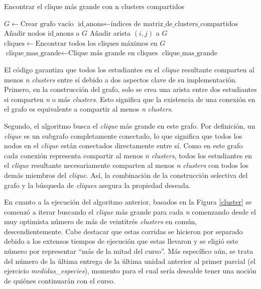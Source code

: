 \documentclass[11pt,a4paper,twoside,openany]{tesis}
\begin{document}
\begin{algorithm}[H]
\caption{Encontrar el clique más grande con n clusters compartidos}
\begin{algorithmic}[1]
    \State $G \gets \text{Crear grafo vacío}$
    \State $\text{id\_anons} \gets \text{índices de matriz\_de\_clusters\_compartidos}$
    \State Añadir nodos $\text{id\_anons}$ a $G$
            \State Añadir arista $(i, j)$ a $G$
        \EndIf
    \EndFor
    \State $\text{cliques} \gets \text{Encontrar todos los cliques máximos en } G$
    \State $\text{clique\_mas\_grande} \gets \text{Clique más grande en cliques}$
    \State \Return $\text{clique\_mas\_grande}$
\EndFunction
\end{algorithmic}
\end{algorithm}

El código garantiza que todos los estudiantes en el \emph{clique} resultante comparten al menos \emph{n} \emph{clusters} entre sí debido a dos aspectos clave de su implementación. Primero, en la construcción del grafo, solo se crea una arista entre dos estudiantes si comparten \emph{n} o más \emph{clusters}. Esto significa que la existencia de una conexión en el grafo es equivalente a compartir al menos \emph{n} \emph{clusters}.

Segundo, el algoritmo busca el \emph{clique} más grande en este grafo. Por definición, un \emph{clique} es un subgrafo completamente conectado, lo que significa que todos los nodos en el \emph{clique} están conectados directamente entre sí. Como en este grafo cada conexión representa compartir al menos \emph{n} \emph{clusters}, todos los estudiantes en el \emph{clique} resultante necesariamente comparten al menos \emph{n} \emph{clusters} con todos los demás miembros del \emph{clique}. Así, la combinación de la construcción selectiva del grafo y la búsqueda de \emph{cliques} asegura la propiedad deseada.

En cuanto a la ejecución del algoritmo anterior, basados en la Figura \ref{cluster} se comenzó a iterar buscando el \emph{clique} más grande para cada \emph{n} comenzando desde el muy optimista número de más de veintitrés \emph{clusters} en común, descendientemente. Cabe destacar que estas corridas se hicieron por separado debido a los extensos tiempos de ejecución que estas llevaron y se eligió este número por representar ``más de la mitad del curso''. Más específico aún, se trata del número de la última entrega de la última unidad anterior al primer parcial (el ejercicio \emph{medidas\_especies}), momento para el cual sería deseable tener una noción de quiénes continuarán con el curso.   
\end{document}
